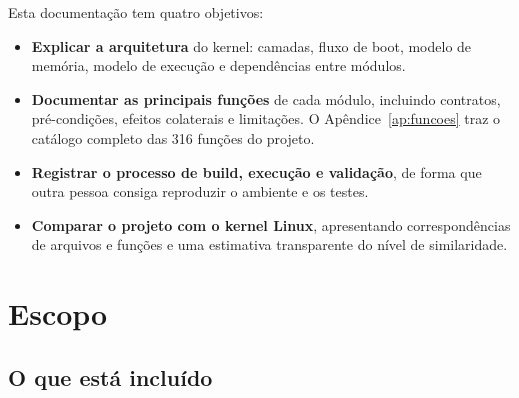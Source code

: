 Esta documenta\c{c}\~ao tem quatro objetivos:

\begin{itemize}
  \item \textbf{Explicar a arquitetura} do kernel: camadas, fluxo de boot,
        modelo de mem\'oria, modelo de execu\c{c}\~ao e depend\^encias entre
        m\'odulos.
  \item \textbf{Documentar as principais fun\c{c}\~oes} de cada m\'odulo,
        incluindo contratos, pr\'e-condi\c{c}\~oes, efeitos colaterais e
        limita\c{c}\~oes. O Ap\^endice~\ref{ap:funcoes} traz o cat\'alogo
        completo das 316 fun\c{c}\~oes do projeto.
  \item \textbf{Registrar o processo de build, execu\c{c}\~ao e valida\c{c}\~ao},
        de forma que outra pessoa consiga reproduzir o ambiente e os testes.
  \item \textbf{Comparar o projeto com o kernel Linux}, apresentando
        correspond\^encias de arquivos e fun\c{c}\~oes e uma estimativa
        transparente do n\'ivel de similaridade.
\end{itemize}

\section{Escopo}

\subsection*{O que est\'a inclu\'ido}

